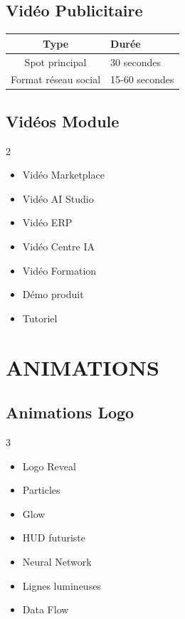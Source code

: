 \documentclass[12pt,a4paper,oneside]{book}
\begin{document}
\section{Vidéo Publicitaire}
\begin{center}
\begin{tabular}{|c|p{10cm}|}
\hline
\rowcolor{violetIA}
\color{white}\textbf{Type} & \color{white}\textbf{Durée} \\
\hline
Spot principal & 30 secondes \\
\hline
Format réseau social & 15-60 secondes \\
\hline
\end{tabular}
\end{center}

\section{Vidéos Module}
\begin{multicols}{2}
\begin{itemize}
\item Vidéo Marketplace
\item Vidéo AI Studio
\item Vidéo ERP
\item Vidéo Centre IA
\item Vidéo Formation
\item Démo produit
\item Tutoriel
\end{itemize}
\end{multicols}

\chapter{ANIMATIONS}

\section{Animations Logo}
\begin{multicols}{3}
\begin{itemize}
\item Logo Reveal
\item Particles
\item Glow
\item HUD futuriste
\item Neural Network
\item Lignes lumineuses
\item Data Flow
\end{itemize}
\end{multicols}
\end{document}
